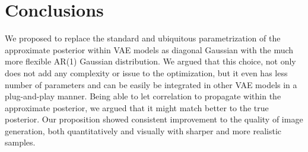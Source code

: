 \documentclass{article}
\begin{document}
\section{Conclusions} \label{sec:conclusions}
We proposed to replace the standard and ubiquitous parametrization of the approximate posterior within VAE models as diagonal Gaussian with the  much more flexible AR(1) Gaussian distribution. We argued that this choice, not only does not add any complexity or issue to the optimization, but it even has less number of parameters and can be easily be integrated in other VAE models in a plug-and-play manner. Being able to let correlation to propagate within the approximate posterior, we argued that it might match better to the true posterior. Our proposition showed consistent improvement to the quality of image generation, both quantitatively and visually with sharper and more realistic samples. 




\end{document}
